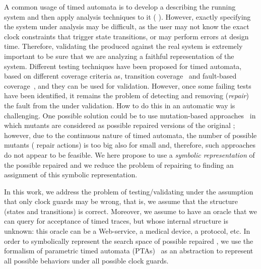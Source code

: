 \begin{tikzborder}{\cite{Gargantini16:validation}}
\begin{tikzborder}{\cite{gargantini_combinatorial_2017}}
\begin{tikzborder}{\cite{gargantini_combinatorial_2017}}
\begin{tikzborder}{\cite{garn2019}}
\begin{tikzborder}{\cite{arcaini2019achieving}}
\begin{tikzborder}{\cite{arcaini2019varivolution}}
A common usage of timed automata
 is to develop a \ta describing the running system and then apply analysis techniques to it (\eg{} \cite{BY03}). However, exactly specifying the system under analysis may be difficult, as the user may not know the exact clock constraints that trigger state transitions, or may perform errors at design time. Therefore, validating the produced \ta against the real system is extremely important to be sure that we are analyzing a faithful representation of the system. Different testing techniques have been proposed for timed automata, based on different coverage criteria as, \eg{} transition coverage~\cite{springintveld2001testing} and fault-based coverage~\cite{Aichernig2015MMT,aichernig2013time}, and they can be used for \ta validation. However, once some failing tests have been identified, it remains the problem of detecting and removing ({\it repair}) the fault from the \ta under validation. How to do this in an automatic way is challenging. One possible solution could be to use mutation-based approaches~\cite{Aichernig2015MMT,aichernig2013time} in which mutants are considered as possible repaired versions of the original \ta; however, due to the continuous nature of timed automata, the number of possible mutants (\ie{} repair actions) is too big also for small \tas and, therefore, such approaches do not appear to be feasible. We here propose to use a {\it symbolic representation} of the possible repaired \tas and we reduce the problem of repairing to finding an assignment of this symbolic representation.

In this work, we address the problem of testing/validating \tas under the assumption that only clock guards may be wrong, that is, we assume that the structure (states and transitions) is correct.
Moreover, we assume to have an oracle that we can query for acceptance of timed traces, but whose internal structure is unknown: this oracle can be a Web-service, a medical device, a protocol, etc. In order to symbolically represent the search space of possible repaired \tas, we use the formalism of parametric timed automata (PTAs)~\cite{AHV93} as an abstraction to represent all possible behaviors under all possible clock guards.


\end{tikzborder}
\end{tikzborder}
\end{tikzborder}
\end{tikzborder}
\end{tikzborder}
\end{tikzborder}
